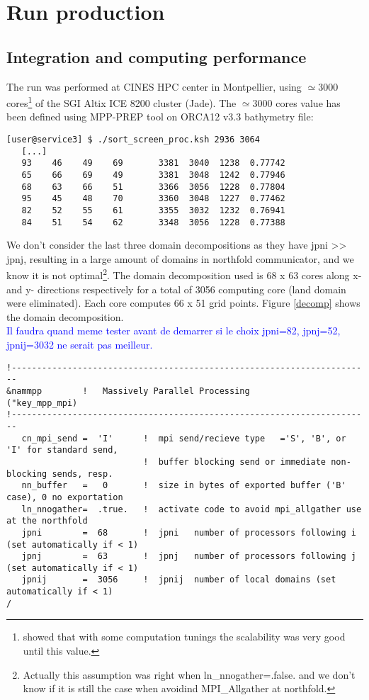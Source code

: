 \section{Run production}

\subsection{Integration and computing performance}

The run was performed at CINES HPC center in Montpellier, using $\simeq$3000 cores\footnote{\cite{Lecointre_perfNEMO3.4} 
showed that with some computation tunings the scalability was very good until this value.} of the SGI Altix ICE 8200 cluster (Jade). 
The $\simeq$3000 cores value has been defined using MPP-PREP tool on ORCA12 v3.3 bathymetry file:
\begin{verbatim}
[user@service3] $ ./sort_screen_proc.ksh 2936 3064
   [...]
   93    46    49    69       3381  3040  1238  0.77742
   65    66    69    49       3381  3048  1242  0.77946
   68    63    66    51       3366  3056  1228  0.77804
   95    45    48    70       3360  3048  1227  0.77462
   82    52    55    61       3355  3032  1232  0.76941
   84    51    54    62       3348  3056  1228  0.77388
\end{verbatim}
We don't consider the last three domain decompositions as they have jpni >> jpnj, resulting in a large amount of domains in northfold communicator, 
and we know it is not optimal\footnote{Actually this assumption was right when ln\_nnogather=.false. and we don't 
know if it is still the case when avoidind MPI\_Allgather at northfold.}. 
The domain decomposition used is 68 x 63 cores along x- and y- directions respectively for a total of 3056 computing core (land domain were eliminated). 
Each core computes 66 x 51 grid points. Figure \ref{decomp} shows the domain decomposition. \\

\textcolor{blue}{Il faudra quand meme tester avant de demarrer si le choix jpni=82, jpnj=52, jpnij=3032 ne serait pas meilleur.}

\scriptsize
\begin{verbatim}
!-----------------------------------------------------------------------
&nammpp        !   Massively Parallel Processing                        ("key_mpp_mpi)
!-----------------------------------------------------------------------
   cn_mpi_send =  'I'      !  mpi send/recieve type   ='S', 'B', or 'I' for standard send,
                           !  buffer blocking send or immediate non-blocking sends, resp.
   nn_buffer   =   0       !  size in bytes of exported buffer ('B' case), 0 no exportation
   ln_nnogather=  .true.   !  activate code to avoid mpi_allgather use at the northfold
   jpni        =  68       !  jpni   number of processors following i (set automatically if < 1)
   jpnj        =  63       !  jpnj   number of processors following j (set automatically if < 1)
   jpnij       =  3056     !  jpnij  number of local domains (set automatically if < 1)
/
\end{verbatim}

